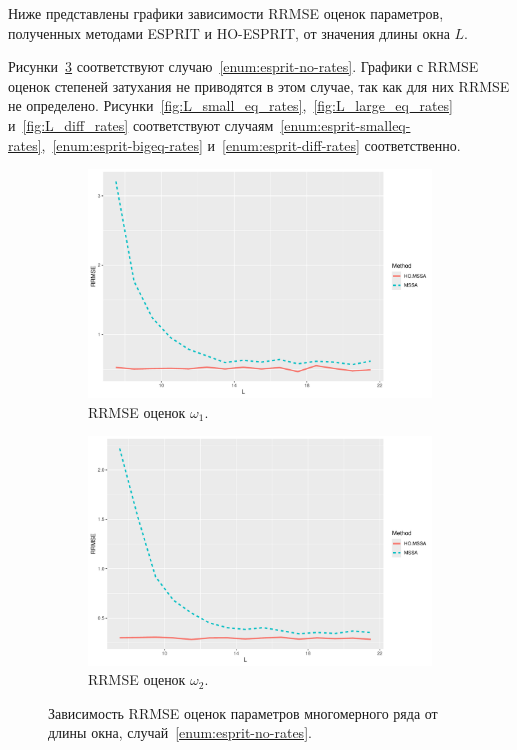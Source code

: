 \documentclass[specialist,
  substylefile=spbu_report.rtx,
subf,href,colorlinks=true, 12pt]{disser}
\theoremstyle{plain}
\theoremstyle{definition}
\theoremstyle{remark}
\begin{document}
Ниже представлены графики зависимости RRMSE оценок параметров,
полученных методами ESPRIT и HO-ESPRIT, от значения длины окна $L$.

Рисунки~\ref{fig:L_no_rates} соответствуют случаю~\ref{enum:esprit-no-rates}.
Графики с RRMSE оценок степеней затухания не приводятся в этом случае, так как для них RRMSE не определено.
Рисунки~\ref{fig:L_small_eq_rates},~\ref{fig:L_large_eq_rates} и~\ref{fig:L_diff_rates}
соответствуют случаям~\ref{enum:esprit-smalleq-rates},~\ref{enum:esprit-bigeq-rates} и~\ref{enum:esprit-diff-rates}
соответственно.
\begin{figure}[!ht]
  \centering
  \begin{subfigure}{0.49\linewidth}
    \includegraphics[width=\linewidth]{freq1_L_no_rates.pdf}
    \caption{RRMSE оценок $\omega_1$.}
    \label{fig:freq1_L_no_rates}
  \end{subfigure}
  \begin{subfigure}{0.49\linewidth}
    \includegraphics[width=\linewidth]{freq2_L_no_rates.pdf}
    \caption{RRMSE оценок $\omega_2$.}
    \label{fig:freq2_L_no_rates}
  \end{subfigure}
  \caption{Зависимость RRMSE оценок параметров многомерного ряда от длины окна,
  случай~\ref{enum:esprit-no-rates}.}
  \label{fig:L_no_rates}
\end{figure}
\end{document}
